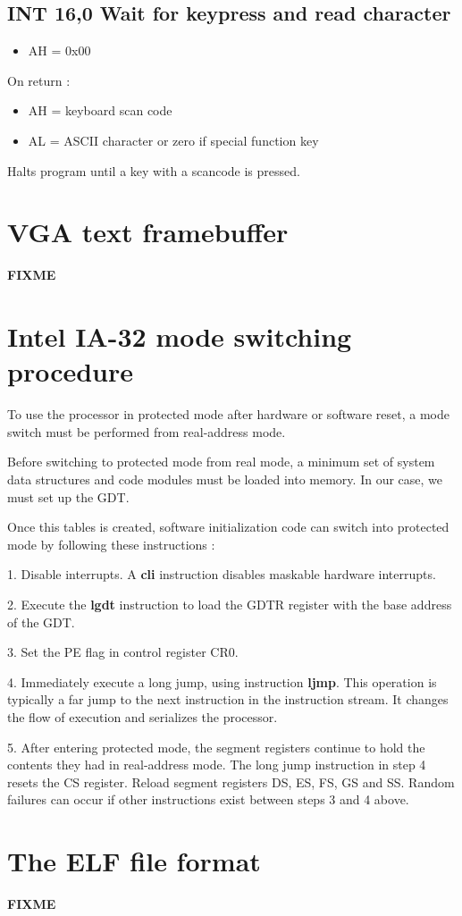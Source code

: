 \subsection{INT 16,0 Wait for keypress and read character}
\begin{itemize}
  \item{AH = 0x00}
\end{itemize}

On return :

\begin{itemize}
  \item{AH = keyboard scan code}
  \item{AL = ASCII character or zero if special function key}
\end{itemize}

Halts program until a key with a scancode is pressed.

%
%
\newpage
\section{VGA text framebuffer}
\textbf{FIXME}

%
%

\newpage
\section{Intel IA-32 mode switching procedure}

To use the processor in protected mode after hardware or software reset, a mode
switch must be performed from real-address mode.

Before switching to protected mode from real mode, a minimum set of system data
structures and code modules must be loaded into memory. In our case, we must
set up the GDT.

Once this tables is created, software initialization code can switch into
protected mode by following these instructions :

1. Disable interrupts. A \textbf{cli} instruction disables maskable hardware
interrupts.

2. Execute the \textbf{lgdt} instruction to load the GDTR register with the
base address of the GDT.

3. Set the PE flag in control register CR0.

4. Immediately execute a long jump, using instruction \textbf{ljmp}. This
operation is typically a far jump to the next instruction in the instruction
stream. It changes the flow of execution and serializes the processor.

5. After entering protected mode, the segment registers continue to hold the
contents they had in real-address mode. The long jump instruction in step 4
resets the CS register. Reload segment registers DS, ES, FS, GS and SS. Random
failures can occur if other instructions exist between steps 3 and 4
above.


%
%

\newpage
\section{The ELF file format}
\textbf{FIXME}
